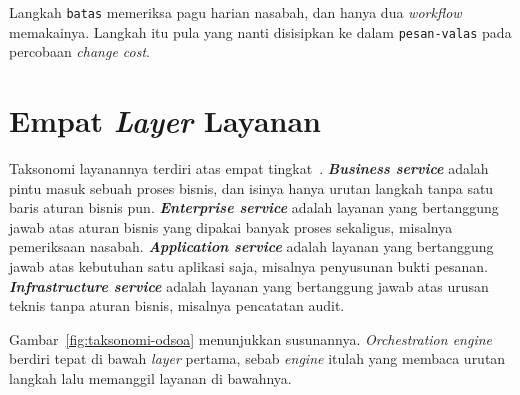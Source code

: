 Langkah \texttt{batas} memeriksa pagu harian nasabah, dan hanya dua
\textit{workflow} memakainya. Langkah itu pula yang nanti disisipkan ke dalam
\texttt{pesan-valas} pada percobaan \textit{change cost}.

\section{Empat \textit{Layer} Layanan}

Taksonomi layanannya terdiri atas empat
tingkat~\cite{richards2020fundamentals}.
\textbf{\textit{Business service}}
adalah pintu masuk sebuah proses bisnis, dan isinya hanya urutan langkah tanpa
satu baris aturan bisnis pun.
\textbf{\textit{Enterprise service}}
adalah layanan yang bertanggung jawab atas aturan bisnis yang dipakai banyak
proses sekaligus, misalnya pemeriksaan nasabah.
\textbf{\textit{Application service}}
adalah layanan yang bertanggung jawab atas kebutuhan satu aplikasi saja,
misalnya penyusunan bukti pesanan.
\textbf{\textit{Infrastructure service}}
adalah layanan yang bertanggung jawab atas urusan teknis tanpa aturan bisnis,
misalnya pencatatan audit.

Gambar~\ref{fig:taksonomi-odsoa} menunjukkan susunannya. \textit{Orchestration engine}
berdiri tepat di bawah \textit{layer} pertama, sebab \textit{engine} itulah yang membaca urutan
langkah lalu memanggil layanan di bawahnya.

